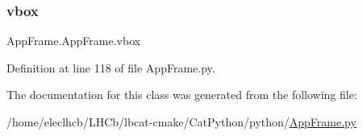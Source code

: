 \mbox{\label{classAppFrame_1_1AppFrame_aece95eafbc42e7bb8a09950ebdf415c3}} 
\subsubsection{\texorpdfstring{vbox}{vbox}}
{\footnotesize\ttfamily App\+Frame.\+App\+Frame.\+vbox}



Definition at line 118 of file App\+Frame.\+py.



The documentation for this class was generated from the following file\+:\begin{DoxyCompactItemize}
\item 
/home/eleclhcb/\+L\+H\+Cb/lbcat-\/cmake/\+Cat\+Python/python/\hyperlink{AppFrame_8py}{App\+Frame.\+py}\end{DoxyCompactItemize}
